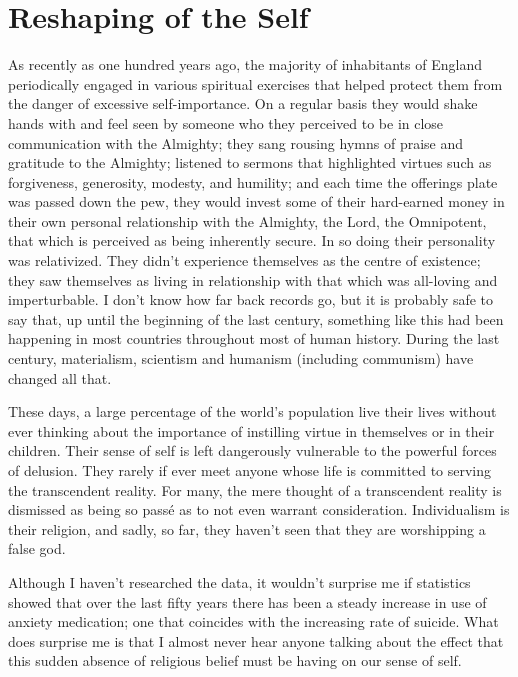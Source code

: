 \section{Reshaping of the Self}

As recently as one hundred years ago, the majority of inhabitants of
England periodically engaged in various spiritual exercises that
helped protect them from the danger of excessive self-importance. On a
regular basis they would shake hands with and feel seen by someone who
they perceived to be in close communication with the Almighty; they sang
rousing hymns of praise and gratitude to the Almighty; listened to
sermons that highlighted virtues such as forgiveness, generosity,
modesty, and humility; and each time the offerings plate was passed down
the pew, they would invest some of their hard-earned money in their own
personal relationship with the Almighty, the Lord, the Omnipotent, that
which is perceived as being inherently secure. In so doing their
personality was relativized. They didn't experience themselves as the
centre of existence; they saw themselves as living in relationship with
that which was all-loving and imperturbable. I don't know how far back
records go, but it is probably safe to say that, up until the beginning
of the last century, something like this had been happening in most
countries throughout most of human history. During the last century,
materialism, scientism and humanism (including communism) have changed
all that.

These days, a large percentage of the world's population live their
lives without ever thinking about the importance of instilling virtue in
themselves or in their children. Their sense of self is left dangerously
vulnerable to the powerful forces of delusion. They rarely if ever meet
anyone whose life is committed to serving the transcendent reality. For
many, the mere thought of a transcendent reality is dismissed as being
so passé as to not even warrant consideration. Individualism is their
religion, and sadly, so far, they haven't seen that they are worshipping
a false god.

Although I haven't researched the data, it wouldn't surprise me if
statistics showed that over the last fifty years there has been a steady
increase in use of anxiety medication; one that coincides with the
increasing rate of suicide\cite{suicide}.
What does surprise me is that I almost never hear anyone
talking about the effect that this sudden absence of religious belief
must be having on our sense of self.


